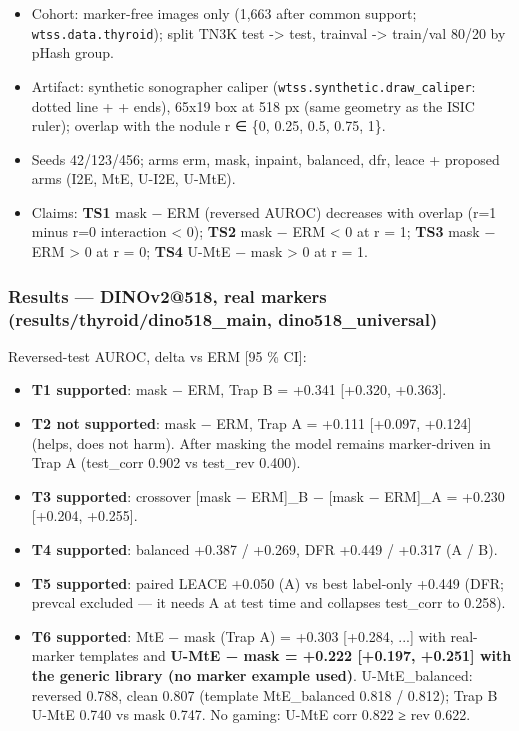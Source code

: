 {\begin{itemize}

\item
  Cohort: marker-free images only (1,663 after common support; \texttt{wtss.data.thyroid}); split TN3K test -\textgreater{} test,
  trainval -\textgreater{} train/val 80/20 by pHash group.
\item
  Artifact: synthetic sonographer caliper (\texttt{wtss.synthetic.draw\_caliper}: dotted line + \textquotesingle+\textquotesingle{} ends), 65x19 box at
  518 px (same geometry as the ISIC ruler); overlap with the nodule r ∈ \{0, 0.25, 0.5, 0.75, 1\}.
\item
  Seeds 42/123/456; arms erm, mask, inpaint, balanced, dfr, leace + proposed arms (I2E, MtE, U-I2E, U-MtE).
\item
  Claims: \textbf{TS1} mask − ERM (reversed AUROC) decreases with overlap (r=1 minus r=0 interaction \textless{} 0);
  \textbf{TS2} mask − ERM \textless{} 0 at r = 1; \textbf{TS3} mask − ERM \textgreater{} 0 at r = 0; \textbf{TS4} U-MtE − mask \textgreater{} 0 at r = 1.
\end{itemize}

\subsubsection{Results --- DINOv2@518, real markers (results/thyroid/dino518\_main, dino518\_universal)}\label{results--dinov2518-real-markers-resultsthyroiddino518_main-dino518_universal}

Reversed-test AUROC, delta vs ERM {[}95 \% CI{]}:

\begin{itemize}

\item
  \textbf{T1 supported}: mask − ERM, Trap B = +0.341 {[}+0.320, +0.363{]}.
\item
  \textbf{T2 not supported}: mask − ERM, Trap A = +0.111 {[}+0.097, +0.124{]} (helps, does not harm). After masking the
  model remains marker-driven in Trap A (test\_corr 0.902 vs test\_rev 0.400).
\item
  \textbf{T3 supported}: crossover {[}mask − ERM{]}\_B − {[}mask − ERM{]}\_A = +0.230 {[}+0.204, +0.255{]}.
\item
  \textbf{T4 supported}: balanced +0.387 / +0.269, DFR +0.449 / +0.317 (A / B).
\item
  \textbf{T5 supported}: paired LEACE +0.050 (A) vs best label-only +0.449 (DFR; prevcal excluded --- it needs A at
  test time and collapses test\_corr to 0.258).
\item
  \textbf{T6 supported}: MtE − mask (Trap A) = +0.303 {[}+0.284, ...{]} with real-marker templates and
  \textbf{U-MtE − mask = +0.222 {[}+0.197, +0.251{]} with the generic library (no marker example used)}.
  U-MtE\_balanced: reversed 0.788, clean 0.807 (template MtE\_balanced 0.818 / 0.812); Trap B U-MtE 0.740 vs
  mask 0.747. No gaming: U-MtE corr 0.822 ≥ rev 0.622.
\end{itemize}

}

